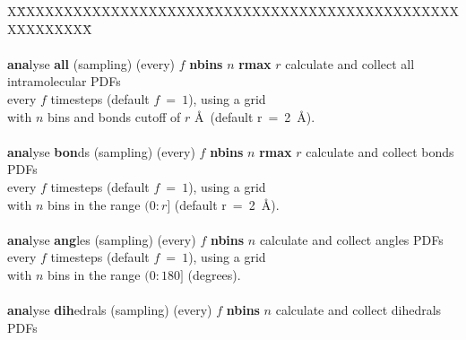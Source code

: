 \begin{tabbing}
X\=XXXXXXXXXXXXXXXXXXXX\=XXXXXXXXXXXXXXXXXXXXXXXXXXXXXXXXXXXX\=\kill
\>                     \> \phantom{xxxxxxxxxxxxxxxxx}  \\
\>                                              \> \\
\> {\bf ana}lyse {\bf all} (sampling) (every) $f$ {\bf nbins} $n$ {\bf rmax} $r$
                                                \> \phantom{xxxxxxxxxxxxxxxxx} calculate and collect all intramolecular PDFs \\
\>                                              \> \phantom{xxxxxxxxxxxxxxxxx} every $f$ timesteps (default $f~=~1$), using a grid \\
\>                                              \> \phantom{xxxxxxxxxxxxxxxxx} with $n$ bins and bonds cutoff of $r$ \AA~(default r~=~2~\AA). \\
\>                                              \> \\
\> {\bf ana}lyse {\bf bon}ds (sampling) (every) $f$ {\bf nbins} $n$ {\bf rmax} $r$
                                                \> \phantom{xxxxxxxxxxxxxxxxx} calculate and collect bonds PDFs \\
\>                                              \> \phantom{xxxxxxxxxxxxxxxxx} every $f$ timesteps (default $f~=~1$), using a grid \\
\>                                              \> \phantom{xxxxxxxxxxxxxxxxx} with $n$ bins in the range $(0:r]$ (default r~=~2~\AA). \\
\>                                              \> \\
\> {\bf ana}lyse {\bf ang}les (sampling) (every) $f$ {\bf nbins} $n$
                                                \> \phantom{xxxxxxxxxxxxxxxxx} calculate and collect angles PDFs \\
\>                                              \> \phantom{xxxxxxxxxxxxxxxxx} every $f$ timesteps (default $f~=~1$), using a grid \\
\>                                              \> \phantom{xxxxxxxxxxxxxxxxx} with $n$ bins in the range $(0:180]$ (degrees). \\
\>                                              \> \\
\> {\bf ana}lyse {\bf dih}edrals (sampling) (every) $f$ {\bf nbins} $n$
                                                \> \phantom{xxxxxxxxxxxxxxxxx} calculate and collect dihedrals PDFs \\

\end{tabbing}
